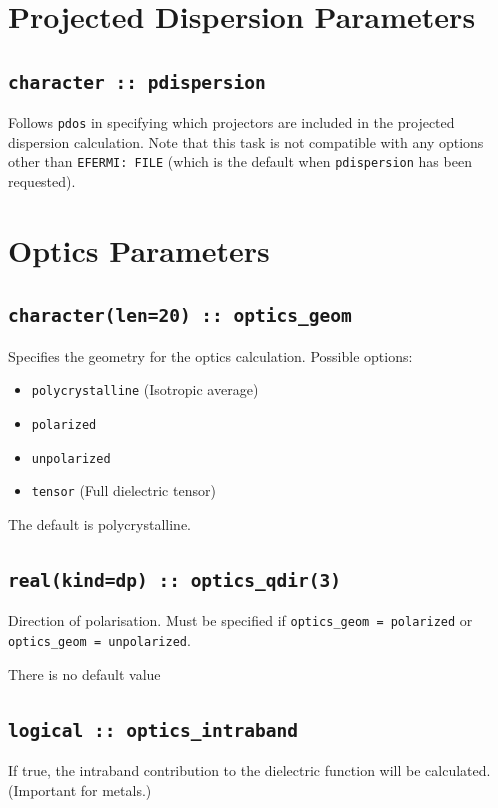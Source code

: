 \documentclass[a4paper,11pt,twoside]{book}
\begin{document}
{\begin{itemize}
\end{itemize}

\section{Projected Dispersion Parameters}

\subsection[pdispersion]{\tt character :: pdispersion}
Follows \verb#pdos# in specifying which projectors are included in the projected
dispersion calculation. Note that this task is not compatible with any options
other than \verb#EFERMI: FILE# (which is the default when \verb#pdispersion# has
been requested).

\section{Optics Parameters}

\subsection[optics\_geom]{\tt character(len=20) :: optics\_geom}

Specifies the geometry for the optics calculation.  Possible options:
\begin{itemize}
\item[{\bf --}]  \verb#polycrystalline# (Isotropic average)
\item[{\bf --}]  \verb#polarized#
\item[{\bf --}]  \verb#unpolarized#
\item[{\bf --}]  \verb#tensor# (Full dielectric tensor)
\end{itemize}
The default is polycrystalline.

\subsection[optics\_qdir]{\tt real(kind=dp) :: optics\_qdir(3)}
Direction of polarisation. Must be specified if \verb#optics_geom = polarized#
or \verb#optics_geom = unpolarized#.

There is no default value

\subsection[optics\_intraband]{\tt logical :: optics\_intraband}
If true, the intraband contribution to the dielectric function will be calculated.  (Important for metals.)

}
\end{document}
